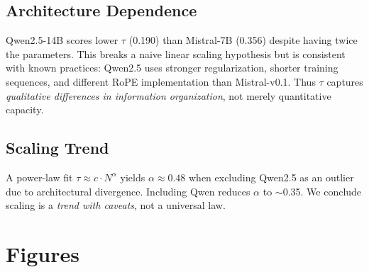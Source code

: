 \documentclass[10pt,a4paper]{article}
\begin{document}
\subsection{Architecture Dependence}
Qwen2.5-14B scores lower $\tau$ (0.190) than Mistral-7B (0.356) despite having twice the parameters. This breaks a naive linear scaling hypothesis but is consistent with known practices: Qwen2.5 uses stronger regularization, shorter training sequences, and different RoPE implementation than Mistral-v0.1. Thus $\tau$ captures \textit{qualitative differences in information organization}, not merely quantitative capacity.

\subsection{Scaling Trend}
A power-law fit $\tau \approx c \cdot N^\alpha$ yields $\alpha \approx 0.48$ when excluding Qwen2.5 as an outlier due to architectural divergence. Including Qwen reduces $\alpha$ to $\sim$0.35. We conclude scaling is a \textit{trend with caveats}, not a universal law.

\section{Figures}
\end{document}

